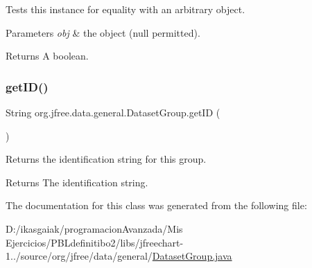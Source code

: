 Tests this instance for equality with an arbitrary object.


\begin{DoxyParams}{Parameters}
{\em obj} & the object ({\ttfamily null} permitted).\\
\hline
\end{DoxyParams}
\begin{DoxyReturn}{Returns}
A boolean. 
\end{DoxyReturn}
\mbox{\label{classorg_1_1jfree_1_1data_1_1general_1_1_dataset_group_abbebf6719be3a55ec339d956a962f9b7}} 
\subsubsection{\texorpdfstring{get\+I\+D()}{getID()}}
{\footnotesize\ttfamily String org.\+jfree.\+data.\+general.\+Dataset\+Group.\+get\+ID (\begin{DoxyParamCaption}{ }\end{DoxyParamCaption})}

Returns the identification string for this group.

\begin{DoxyReturn}{Returns}
The identification string. 
\end{DoxyReturn}


The documentation for this class was generated from the following file\+:\begin{DoxyCompactItemize}
\item 
D\+:/ikasgaiak/programacion\+Avanzada/\+Mis Ejercicios/\+P\+B\+Ldefinitibo2/libs/jfreechart-\/1../source/org/jfree/data/general/\mbox{\hyperlink{_dataset_group_8java}{Dataset\+Group.\+java}}\end{DoxyCompactItemize}
